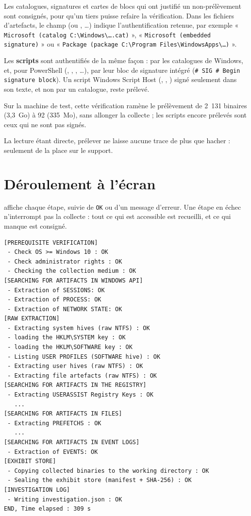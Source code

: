 \documentclass[11pt,a4paper,oneside]{report}
\begin{document}
Les catalogues, signatures et cartes de blocs qui ont justifié un
non-prélèvement sont consignés, pour qu'un tiers puisse refaire la vérification.
Dans les fichiers d'artefacts, le champ  (ou
, \ldots) indique
l'authentification retenue, par exemple
« \texttt{Microsoft (catalog C:\textbackslash{}Windows\textbackslash{}\ldots.cat)} »,
« \texttt{Microsoft (embedded signature)} » ou
« \texttt{Package (package C:\textbackslash{}Program Files\textbackslash{}WindowsApps\textbackslash{}\ldots)} ».

Les \textbf{scripts} sont authentifiés de la même façon : par les catalogues de
Windows, et, pour PowerShell (, , ,
\ldots), par leur bloc de signature intégré
(\texttt{\# SIG \# Begin signature block}). Un script Windows Script Host
(, , ) signé seulement dans son texte, et
non par un catalogue, reste prélevé.

Sur la machine de test, cette vérification ramène le prélèvement de 2~131
binaires (3,3~Go) à 92 (335~Mo), sans allonger la collecte ; les scripts encore
prélevés sont ceux qui ne sont pas signés.

La lecture étant directe, prélever ne laisse aucune trace de plus que hacher :
seulement de la place sur le support.

\section{Déroulement à l'écran}

\wac{} affiche chaque étape, suivie de \texttt{OK} ou d'un message d'erreur. Une
étape en échec n'interrompt pas la collecte : tout ce qui est accessible est
recueilli, et ce qui manque est consigné.

\begin{lstlisting}
[PREREQUISITE VERIFICATION]
 - Check OS >= Windows 10 : OK
 - Check administrator rights : OK
 - Checking the collection medium : OK
[SEARCHING FOR ARTIFACTS IN WINDOWS API]
 - Extraction of SESSIONS: OK
 - Extraction of PROCESS: OK
 - Extraction of NETWORK STATE: OK
[RAW EXTRACTION]
 - Extracting system hives (raw NTFS) : OK
 - loading the HKLM\SYSTEM key : OK
 - loading the HKLM\SOFTWARE key : OK
 - Listing USER PROFILES (SOFTWARE hive) : OK
 - Extracting user hives (raw NTFS) : OK
 - Extracting file artefacts (raw NTFS) : OK
[SEARCHING FOR ARTIFACTS IN THE REGISTRY]
 - Extracting USERASSIST Registry Keys : OK
   ...
[SEARCHING FOR ARTIFACTS IN FILES]
 - Extracting PREFETCHS : OK
   ...
[SEARCHING FOR ARTIFACTS IN EVENT LOGS]
 - Extraction of EVENTS: OK
[EXHIBIT STORE]
 - Copying collected binaries to the working directory : OK
 - Sealing the exhibit store (manifest + SHA-256) : OK
[INVESTIGATION LOG]
 - Writing investigation.json : OK
END, Time elapsed : 309 s
\end{lstlisting}
\end{document}
